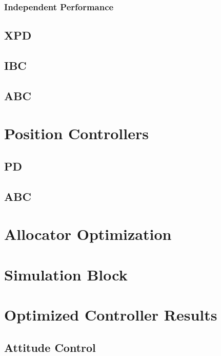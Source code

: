 \subsubsection{Independent Performance}
\label{subsubsec:simulation.atttiude.pd.independent}
\subsection{XPD}
\label{subsec:simulation.attitude.xpd}
\subsection{IBC}
\subsection{ABC}
\section{Position Controllers}
\subsection{PD}
\subsection{ABC}
\section{Allocator Optimization}
\label{sec:simulation.allocator}
\section{Simulation Block}
\label{sec:simulation.block}
\section{Optimized Controller Results}
\label{sec:simulation.comparison}
\subsection{Attitude Control}
\label{subsec:simulation.comparison.attitude}
